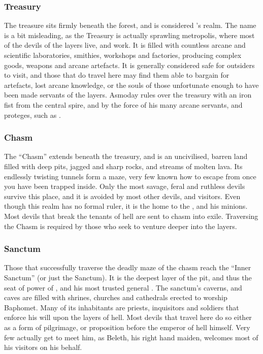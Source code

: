 \subsubsection{Treasury}
\label{sec:Treasury}

The treasure sits firmly beneath the forest, and is considered
's realm. The name is a bit misleading, as the Treasury
is actually sprawling metropolis, where most of the devils of the layers live,
and work. It is filled with countless arcane and scientific laboratories,
smithies, workshops and factories, producing complex goods, weapons and arcane
artefacts. It is generally considered safe for outsiders to visit, and those
that do travel here may find them able to bargain for artefacts, lost arcane
knowledge, or the souls of those unfortunate enough to have been made servants
of the layers. Asmoday rules over the treasury with an iron fist from the
central spire, and by the force of his many arcane servants, and proteges,
such as .

\subsubsection{Chasm}
\label{sec:Chasm}

The ``Chasm'' extends beneath the treasury, and is an uncivilised, barren land
filled with deep pits, jagged and sharp rocks, and streams of molten lava. Its
endlessly twisting tunnels form a maze, very few known how to escape from once
you have been trapped inside. Only the most savage, feral and ruthless devils
survive this place, and it is avoided by most other devils, and visitors. Even
though this realm has no formal ruler, it is the home to the
, and his minions. Most devils that break the tenants
of hell are sent to chasm into exile. Traversing the Chasm is required by
those who seek to venture deeper into the layers.

\subsubsection{Sanctum}
\label{sec:Sanctum}

Those that successfully traverse the deadly maze of the chasm reach the
``Inner Sanctum'' (or just the Sanctum). It is the deepest layer of the pit,
and thus the seat of power of , and his most trusted
general . The sanctum's caverns, and caves are filled with
shrines, churches and cathedrals erected to worship Baphomet. Many of its
inhabitants are priests, inquisitors and soldiers that enforce his will upon
the layers of hell. Most devils that travel here do so either as a form of
pilgrimage, or proposition before the emperor of hell himself. Very few
actually get to meet him, as Beleth, his right hand maiden, welcomes most of
his visitors on his behalf.
